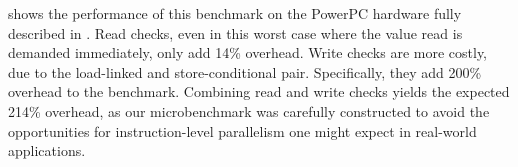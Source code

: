 
 shows the performance of this benchmark on the
PowerPC hardware fully described in .
Read checks, even in this worst case where the value read is demanded
immediately, only add 14\% overhead.  Write checks are more costly,
due to the load-linked and store-conditional pair.  Specifically, they add 200\%
overhead to the benchmark.  Combining read and write checks yields the
expected 214\% overhead, as our microbenchmark was carefully constructed to
avoid the opportunities for instruction-level parallelism one might
expect in real-world applications.

